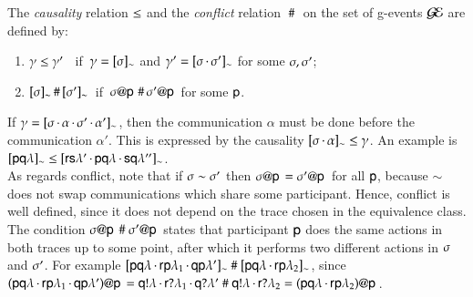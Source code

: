 \begin{definition} \label{sgeo}
The {\em causality} relation $\leq$ and the {\em conflict} relation $~\#~$ on the set of g-events $\mathcal{G\!E}$ are defined by:
\begin{enumerate}
\item{} $\gamma\leq\gamma'$
~if~$\gamma=[\sigma]_{\sim}$ and $\gamma'=[\sigma\,{\cdot}\,\sigma']_{\sim}$ for some $\sigma,\sigma'$;
\item{}
  $[\sigma]_{\sim}\,\#\,[\sigma']_{\sim}$~if~$\sigma @ {\sf p}\,\,\#\,\sigma' @ {\sf p}\,$
  for some ${\sf p}$.
\end{enumerate}
\end{definition}
\noindent If
$\gamma=[\sigma\,{\cdot}\,\alpha\,{\cdot}\,\sigma'\,{\cdot}\,\alpha']_{\sim}$,
then the communication $\alpha$ must be done before the communication
$\alpha'$. This is expressed by the causality
$[\sigma\,{\cdot}\,\alpha]_{\sim}\leq\gamma$.  An example is
$[{\sf p}{\sf q}\lambda]_{\sim}\leq[{\sf r}{\sf s}\lambda'\,{\cdot}\,{\sf p}{\sf q}\lambda\,{\cdot}\,{\sf s}{\sf q}\lambda'']_{\sim}$. \\
As regards conflict, note that if $\sigma\sim\sigma'$ then
$\sigma @ {\sf p}\,=\sigma' @ {\sf p}\,$ for all ${\sf p}$, because $\sim$
does not swap communications which share some participant.  Hence,
conflict is well defined, since it does not depend on the trace chosen
in the equivalence class. The condition
$\sigma @ {\sf p}\,~\#~\sigma' @ {\sf p}\,$ states that participant ${\sf p}$
does the same actions in both traces up to some point, after which it
performs two different actions in $\sigma$ and $\sigma'$.  For example $[{\sf p}{\sf q}\lambda\,{\cdot}\,{\sf r}{\sf p}\lambda_1\,{\cdot}\,{\sf q}{\sf p}\lambda']_{\sim}~\#~  [{\sf p}{\sf q}\lambda\,{\cdot}\,{\sf r}{\sf p}\lambda_2]_{\sim}$, since 
$({\sf p}{\sf q}\lambda\,{\cdot}\,{\sf r}{\sf p}\lambda_1\,{\cdot}\,{\sf q}{\sf p}\lambda') @ {\sf p}\,=
   {\sf q}!\lambda\,{\cdot}\,{\sf r}?\lambda_1\,{\cdot}\,{\sf q}?\lambda'~\#~{\sf q}!\lambda\,{\cdot}\,{\sf r}?\lambda_2=
({\sf p}{\sf q}\lambda\,{\cdot}\,{\sf r}{\sf p}\lambda_2) @ {\sf p}\,$.

